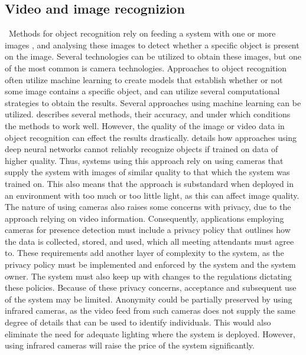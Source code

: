 \subsection{Video and image recognizion} \label{sec:video-based-detection}\
Methods for object recognition rely on feeding a system with one or more images \cite{huttenlocher1987object, computational_strategies_for_object_recog}, and analysing these images to detect whether a specific object is present on the image.
Several technologies can be utilized to obtain these images, but one of the most common is camera technologies\cite{FUERTES2022103473}. 
Approaches to object recognition often utilize machine learning to create models that establish whether or not some image contains a specific object\cite{huttenlocher1987object}, and can utilize several computational strategies to obtain the results\cite{computational_strategies_for_object_recog}. 
Several approaches using machine learning can be utilized. 
\citeauthor{object_recognision_survey} \cite{object_recognision_survey} describes several methods, their accuracy, and under which conditions the methods to work well. 
However, the quality of the image or video data in object recognition can effect the results drastically.
\citeauthor{vid_qual_affects} \cite{vid_qual_affects} details how approaches using deep neural networks cannot reliably recognize objects if trained on data of higher quality. 
Thus, systems using this approach rely on using cameras that supply the system with images of similar quality to that which the system was trained on.
This also means that the approach is substandard when deployed in an environment with too much or too little light, as this can affect image quality.  
The nature of using cameras also raises some concerns with privacy, due to the approach relying on video information. 
Consequently, applications employing cameras for presence detection must include a privacy policy that outlines how the data is collected, stored, and used, which all meeting attendants must agree to.
These requirements add another layer of complexity to the system, as the privacy policy must be implemented and enforced by the system and the system owner.
The system must also keep up with changes to the regulations dictating these policies.
Because of these privacy concerns, acceptance and subsequent use of the system may be limited\cite{granath_detecting_nodate, tang_occupancy_2020, privacyPreservingSensor}.
Anonymity could be partially preserved by using infrared cameras, as the video feed from such cameras does not supply the same degree of details that can be used to identify individuals. 
This would also eliminate the need for adequate lighting where the system is deployed.  
However, using infrared cameras will raise the price of the system significantly. 
